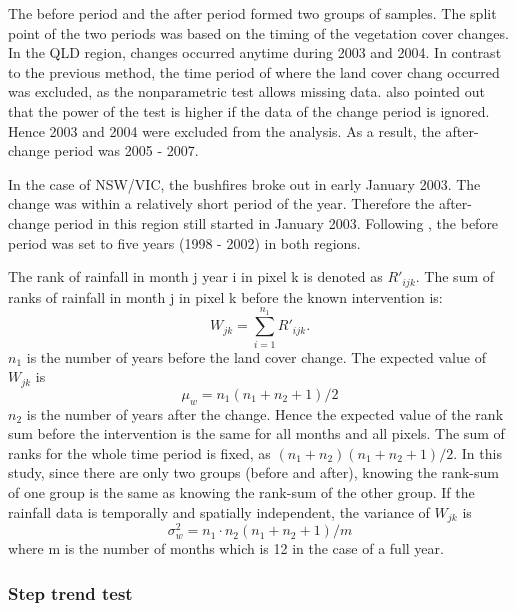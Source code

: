 \documentclass[draft,linenumbers]{agujournal}
\begin{document}
\begin{article}
The before period and the after period formed two groups of samples. The split point of the two periods was based on the timing of the vegetation cover changes. In the QLD region, changes occurred anytime during 2003 and 2004. In contrast to the previous method, the time period of where the land cover chang occurred was excluded, as the nonparametric test allows missing data. \citet{Hirsch1985} also pointed out that the power of the test is higher if the data of the change period is ignored. Hence 2003 and 2004 were excluded from the analysis. As a result, the after-change period was 2005 - 2007. 

In the case of NSW/VIC, the bushfires broke out in early January 2003. The change was within a relatively short period of the year. Therefore the after-change period in this region still started in January 2003. Following \citet{Hirsch1985}, the before period was set to five years (1998 - 2002) in both regions. %
  
The rank of rainfall in month j year i in pixel k is denoted as $R'_{ijk}$. The sum of ranks of rainfall in month j in pixel k before the known intervention is:  
\begin{equation}
  W_{jk} = \sum_{i=1}^{n_1}R'_{ijk}.
  \label{eqn:Wj}
\end{equation}
$n_1$ is the number of years before the land cover change. The expected value of $W_{jk}$ is 
\begin{equation}
  \mu_w=n_1(n_1+n_2+1)/2
\end{equation}
$n_2$ is the number of years after the change. Hence the expected value of the rank sum before the intervention is the same for all months and all pixels. The sum of ranks for the whole time period is fixed, as $(n_1+n_2)(n_1+n_2+1)/2$. In this study, since there are only two groups (before and after), knowing the rank-sum of one group is the same as knowing the rank-sum of the other group. If the rainfall data is temporally and spatially independent, the variance of $W_{jk}$ is 
\begin{equation}
  \sigma^2_w = n_1\cdot n_2(n_1+n_2+1)/m
\end{equation}
where m is the number of months which is 12 in the case of a full year. 

\subsubsection{Step trend test}


\end{article}
\end{document}
